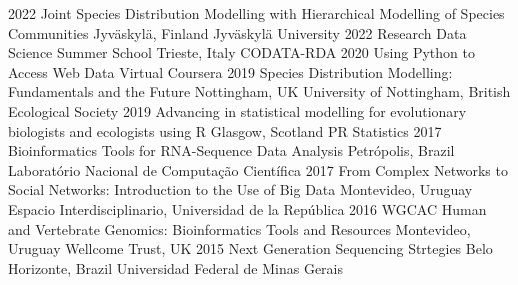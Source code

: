 \documentclass[9pt]{developercv} %
\begin{document}
\begin{entrylist}
	\entrylong
		{2022}
		{Joint Species Distribution Modelling with Hierarchical Modelling of Species Communities}
		{Jyväskylä, Finland}
		{Jyväskylä University}	
	\entrylong
		{2022}
		{Research Data Science Summer School}
		{Trieste, Italy}
		{CODATA-RDA}	
	\entrylong
		{2020}
		{Using Python to Access Web Data}
		{Virtual}
		{Coursera}	
	\entrylong
		{2019}
		{Species Distribution Modelling: Fundamentals and the Future}
		{Nottingham, UK}
		{University of Nottingham, British Ecological Society}	
	\entrylong
		{2019}
		{Advancing in statistical modelling for evolutionary biologists and ecologists using R}
		{Glasgow, Scotland}
		{PR Statistics}	
	\entrylong
		{2017}
		{Bioinformatics Tools for RNA-Sequence Data Analysis}
		{Petrópolis, Brazil}
		{Laboratório Nacional de Computação Científica}
	\entrylong
		{2017}
		{From Complex Networks to Social Networks: Introduction to the Use of Big Data}
		{Montevideo, Uruguay}
		{Espacio Interdisciplinario, Universidad de la República}
	\entrylong
		{2016}
		{WGCAC Human and Vertebrate Genomics: Bioinformatics Tools and Resources}
		{Montevideo, Uruguay}
		{Wellcome Trust, UK}
	\entrylong
		{2015}
		{Next Generation Sequencing Strtegies}
		{Belo Horizonte, Brazil}
		{Universidad Federal de Minas Gerais}

\end{entrylist}


\end{document}
